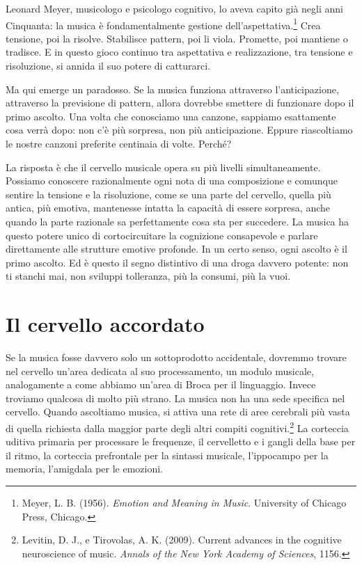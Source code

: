 Leonard Meyer, musicologo e psicologo cognitivo, lo aveva capito gi\`{a} negli anni Cinquanta: la musica \`{e} fondamentalmente gestione dell'aspettativa.\footnote{Meyer, L. B. (1956). \textit{Emotion and Meaning in Music}. University of Chicago Press, Chicago.} Crea tensione, poi la risolve. Stabilisce pattern, poi li viola. Promette, poi mantiene o tradisce. E in questo gioco continuo tra aspettativa e realizzazione, tra tensione e risoluzione, si annida il suo potere di catturarci.

Ma qui emerge un paradosso. Se la musica funziona attraverso l'anticipazione, attraverso la previsione di pattern, allora dovrebbe smettere di funzionare dopo il primo ascolto. Una volta che conosciamo una canzone, sappiamo esattamente cosa verr\`{a} dopo: non c'\`{e} pi\`{u} sorpresa, non pi\`{u} anticipazione. Eppure riascoltiamo le nostre canzoni preferite centinaia di volte. Perch\'{e}?

La risposta \`{e} che il cervello musicale opera su pi\`{u} livelli simultaneamente. Possiamo conoscere razionalmente ogni nota di una composizione e comunque sentire la tensione e la risoluzione, come se una parte del cervello, quella pi\`{u} antica, pi\`{u} emotiva, mantenesse intatta la capacit\`{a} di essere sorpresa, anche quando la parte razionale sa perfettamente cosa sta per succedere. La musica ha questo potere unico di cortocircuitare la cognizione consapevole e parlare direttamente alle strutture emotive profonde. In un certo senso, ogni ascolto \`{e} il primo ascolto. Ed \`{e} questo il segno distintivo di una droga davvero potente: non ti stanchi mai, non sviluppi tolleranza, pi\`{u} la consumi, pi\`{u} la vuoi.

\section{Il cervello accordato}

Se la musica fosse davvero solo un sottoprodotto accidentale, dovremmo trovare nel cervello un'area dedicata al suo processamento, un modulo musicale, analogamente a come abbiamo un'area di Broca per il linguaggio. Invece troviamo qualcosa di molto pi\`{u} strano. La musica non ha una sede specifica nel cervello. Quando ascoltiamo musica, si attiva una rete di aree cerebrali pi\`{u} vasta di quella richiesta dalla maggior parte degli altri compiti cognitivi.\footnote{Levitin, D. J., e Tirovolas, A. K. (2009). Current advances in the cognitive neuroscience of music. \textit{Annals of the New York Academy of Sciences}, 1156.} La corteccia uditiva primaria per processare le frequenze, il cervelletto e i gangli della base per il ritmo, la corteccia prefrontale per la sintassi musicale, l'ippocampo per la memoria, l'amigdala per le emozioni.


